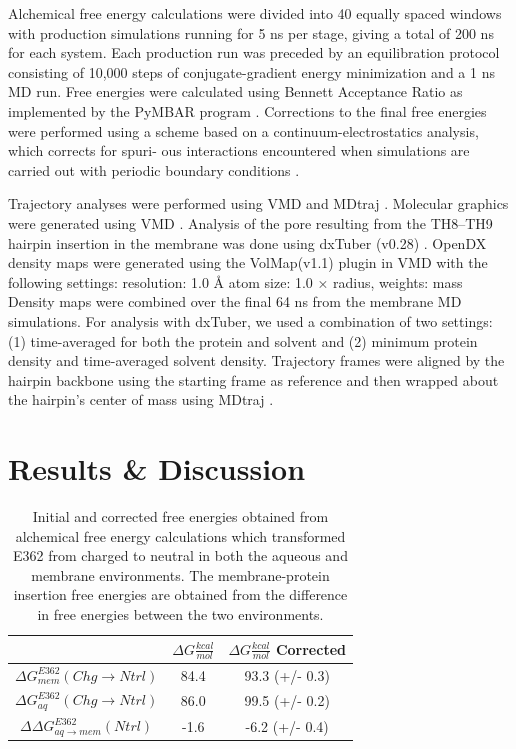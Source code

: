 Alchemical free energy calculations were divided into 40 equally spaced windows with production simulations running for 5 ns per stage, giving a total of 200 ns for each system.
Each production run was preceded by an equilibration protocol consisting of 10,000 steps of conjugate-gradient energy minimization and a 1 ns MD run. 
Free energies were calculated using Bennett Acceptance Ratio \cite{bennett1976efficient} as implemented by the PyMBAR program \cite{shirts2008statistically, chodera2007use}.
Corrections to the final free energies were performed using a scheme based on a continuum-electrostatics analysis, which corrects for spuri- ous interactions encountered when simulations are carried out with periodic boundary conditions \cite{rocklin2013calculating}.

Trajectory analyses were performed using VMD and MDtraj \cite{mcgibbon2015mdtraj}.
Molecular graphics were generated using VMD \cite{humphrey1996vmd}.
Analysis of the pore resulting from the TH8–TH9 hairpin insertion in the membrane was done using dxTuber (v0.28) \cite{raunest2011dxtuber}.
OpenDX density maps were generated using the VolMap(v1.1) plugin in VMD with the following settings: resolution: 1.0 Å atom size: 1.0 × radius, weights: mass
Density maps were combined over the final 64 ns from the membrane MD simulations.
For analysis with dxTuber, we used a combination of two settings: (1) time-averaged for both the protein and solvent and (2) minimum protein density and time-averaged solvent density. Trajectory frames were aligned by the hairpin backbone using the starting frame as reference and then wrapped about the hairpin’s center of mass using MDtraj \cite{mcgibbon2015mdtraj}.

\section{Results \& Discussion}

\begin{table}[H]
\centering
\caption[Initial and corrected free energies]{Initial and corrected\cite{rocklin2013calculating} free energies obtained from alchemical free energy calculations which transformed E362 from charged to neutral in both the aqueous and membrane environments. The membrane-protein insertion free energies are obtained from the difference in free energies between the two environments.}
\label{tbl:dtt_ddG}
\begin{tabular}{|c|c|c|}
\hline
& \boldmath$\Delta G\frac{kcal}{mol}$   & \boldmath$\Delta G\frac{kcal}{mol}$ Corrected     \\ \hline
$\Delta G_{mem}^{E362}(Chg\rightarrow Ntrl)$ & 84.4 & 93.3 (+/- 0.3) \\ \hline
$\Delta G_{aq}^{E362}(Chg\rightarrow Ntrl)$  & 86.0 & 99.5 (+/- 0.2) \\ \hline
$\Delta\Delta G_{aq\rightarrow mem}^{E362}(Ntrl)$ & -1.6 & -6.2 (+/- 0.4) \\ \hline
\end{tabular}
\end{table}

